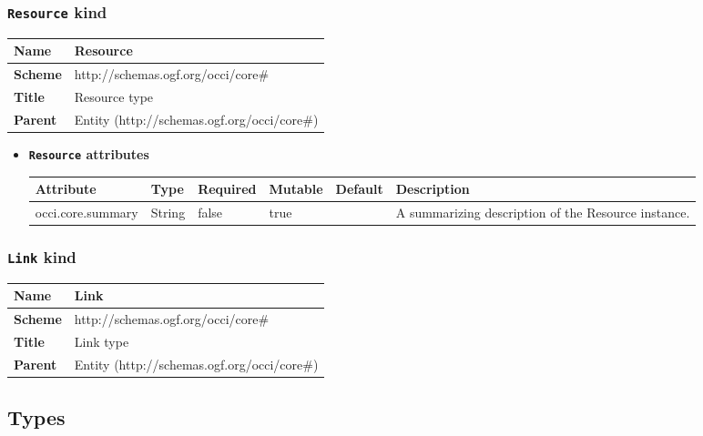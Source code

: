 \subsubsection{\texttt{Resource} kind}
\begin{center}
\begin{tabular}{|l|l|}
  \hline
  \textbf{Name} & Resource \\
  \hline  
  \textbf{Scheme} & http://schemas.ogf.org/occi/core\# \\
  \hline
  \textbf{Title} & Resource type \\
  \hline
  \textbf{Parent} & Entity (http://schemas.ogf.org/occi/core\#) \\
  \hline
\end{tabular}
\end{center}
\begin{itemize}
\item \textbf{\texttt{Resource} attributes}

\begin{tabularx}{\textwidth}{|l|l|p{1.4cm}|p{1.3cm}|l|X|}
  \hline
  \textbf{Attribute} & \textbf{Type} & \textbf{Required} & \textbf{Mutable} & \textbf{Default} & \textbf{Description} \\
  \hline  
  occi.core.summary & String & false & true &  & A summarizing description of the Resource instance. \\
  \hline
\end{tabularx}
\end{itemize}


\subsubsection{\texttt{Link} kind}
\begin{center}
\begin{tabular}{|l|l|}
  \hline
  \textbf{Name} & Link \\
  \hline  
  \textbf{Scheme} & http://schemas.ogf.org/occi/core\# \\
  \hline
  \textbf{Title} & Link type \\
  \hline
  \textbf{Parent} & Entity (http://schemas.ogf.org/occi/core\#) \\
  \hline
\end{tabular}
\end{center}


\subsection{Types}
